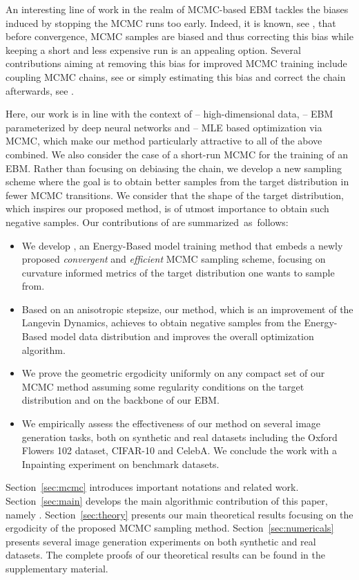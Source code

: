 \documentclass[letterpaper]{article} %
\begin{document}
An interesting line of work in the realm of MCMC-based EBM tackles the biases induced by stopping the MCMC runs too early. 
Indeed, it is known, see \cite{meyn2012markov}, that before convergence, MCMC samples are biased and thus correcting this bias while keeping a short and less expensive run is an appealing option.
Several contributions aiming at removing this bias for improved MCMC training include coupling MCMC chains, see \cite{qiu2019unbiased,jacob2020unbiased} or simply estimating this bias and correct the chain afterwards, see \cite{du2020improved}.

Here, our work is in line with the context of -- high-dimensional data, -- EBM parameterized by deep neural networks and -- MLE based optimization via MCMC, which make our method particularly attractive to all of the above combined. 
We also consider the case of a short-run MCMC for the training of an EBM.
Rather than focusing on debiasing the chain, we develop a new sampling scheme where the goal is to obtain better samples from the target distribution in fewer MCMC transitions.
We consider that the shape of the target distribution, which inspires our proposed method, is of utmost importance to obtain such negative samples.
Our contributions of are summarized~as~follows:
\begin{itemize}
\item We develop \algo, an Energy-Based model training method that embeds a newly proposed \emph{convergent} and \emph{efficient} MCMC sampling scheme, focusing on curvature informed metrics of the target distribution one wants to sample from.
\item Based on an anisotropic stepsize, our method, which is an improvement of the Langevin Dynamics, achieves to obtain negative samples from the Energy-Based model data distribution and improves the overall optimization algorithm.
\item We prove the geometric ergodicity uniformly on any compact set of our MCMC method assuming some regularity conditions on the target distribution and on the backbone of our EBM.
\item We empirically assess the effectiveness of our method on several image generation tasks, both on synthetic and real datasets including the Oxford Flowers 102 dataset, CIFAR-10 and CelebA. We conclude the work with a Inpainting experiment on benchmark datasets.
\end{itemize}

Section~\ref{sec:mcmc} introduces important notations and related work.
Section~\ref{sec:main} develops the main algorithmic contribution of this paper, namely \algo.
Section~\ref{sec:theory} presents our main theoretical results focusing on the ergodicity of the proposed MCMC sampling method.
Section~\ref{sec:numericals} presents several image generation experiments on both synthetic and real datasets.
The complete proofs of our theoretical results can be found in the supplementary material.
\end{document}
